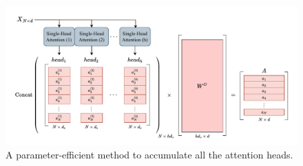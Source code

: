 
\begin{figure}
    \centering
    \includegraphics[width=1\linewidth]{fig/concat_project_A.pdf}
    \caption{A parameter-efficient method to accumulate all the attention heads.}
    \label{fig:concat_project_A}
\end{figure}
